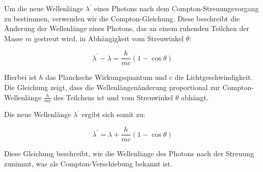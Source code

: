 Um die neue Wellenlänge $\lambda^{\prime}$ eines Photons nach dem Compton-Streuungsvorgang zu bestimmen, verwenden wir die Compton-Gleichung. Diese beschreibt die Änderung der Wellenlänge eines Photons, das an einem ruhenden Teilchen der Masse $m$ gestreut wird, in Abhängigkeit vom Streuwinkel $\theta$:

\[
\lambda^{\prime} - \lambda = \frac{h}{m c} (1 - \cos \theta)
\]

Hierbei ist $h$ das Plancksche Wirkungsquantum und $c$ die Lichtgeschwindigkeit. Die Gleichung zeigt, dass die Wellenlängenänderung proportional zur Compton-Wellenlänge $\frac{h}{m c}$ des Teilchens ist und vom Streuwinkel $\theta$ abhängt. 

Die neue Wellenlänge $\lambda^{\prime}$ ergibt sich somit zu:

\[
\lambda^{\prime} = \lambda + \frac{h}{m c} (1 - \cos \theta)
\]

Diese Gleichung beschreibt, wie die Wellenlänge des Photons nach der Streuung zunimmt, was als Compton-Verschiebung bekannt ist.